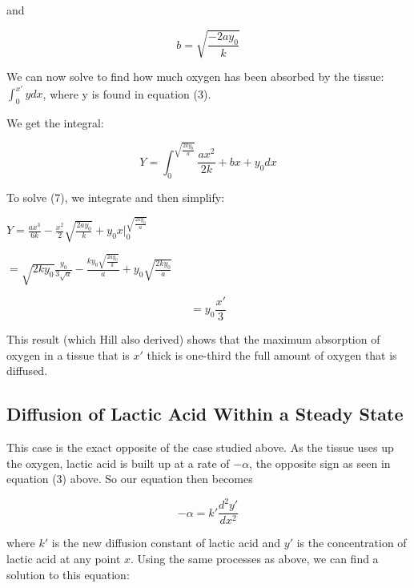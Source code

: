 \documentclass{article}
\begin{document}
and 

\begin{equation}
    b = \sqrt{\frac{-2ay_0}{k}}
\end{equation} 

We can now solve to find how much oxygen has been absorbed by the tissue: $ \int_{0}^{x'} y dx $, where y is found in
equation (3).

We get the integral:

\begin{equation}
    Y = \int_{0}^{\sqrt{\frac{2ky_0}{a}}} \frac{ax^2}{2k} + bx + y_0 dx
\end{equation}

To solve (7), we integrate and then simplify:

\vspace*{0.25cm}

$Y = \frac{ax^3}{6k} - \frac{x^2}{2}\sqrt{\frac{2ay_0}{k}} + y_0x \Bigg|_0^{\sqrt{\frac{2ky_0}{a}}}$
\vspace*{0.25cm}

$ = \sqrt{2ky_0} \frac{y_0}{3\sqrt{a}} - \frac{ky_0\sqrt{\frac{2ay_0}{k}}}{a} + y_0\sqrt{\frac{2ky_0}{a}}$
\vspace*{0.25cm}

\begin{equation}
    = y_0 \frac{x'}{3}
\end{equation}

This result (which Hill also derived) shows that the maximum absorption of oxygen in a tissue that is $x'$ thick
is one-third the full amount of oxygen that is diffused. 

\subsection{Diffusion of Lactic Acid Within a Steady State}


This case is the exact opposite of the case studied above. As the tissue uses up the oxygen, lactic acid is built up
at a rate of $-\alpha$, the opposite sign as seen in equation (3) above. So our equation then becomes 

\begin{equation}
    -\alpha = k' \frac{d^2y'}{dx^2}
    \label{eq:lactic_acid}
\end{equation}

where $k'$ is the new diffusion constant of lactic acid and $y'$ is the concentration of lactic acid at any point $x$.
Using the same processes as above, we can find a solution to this equation:
\end{document}
